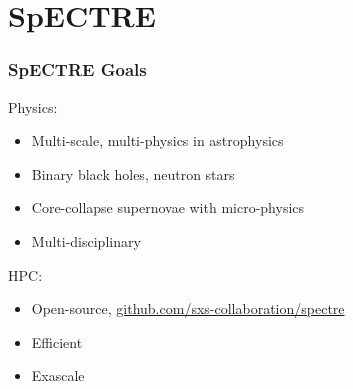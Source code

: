 \documentclass[svgnames,tikz,serif,ragged2e]{beamer}
\begin{document}
\makeatletter

\makeatother


\begin{frame}
  \titlepage{}
\end{frame}

\section{SpECTRE}


\begin{frame}
  \frametitle{SpECTRE Goals}
  Physics:
  \begin{itemize}
  \item Multi-scale, multi-physics in astrophysics
  \item Binary black holes, neutron stars
  \item Core-collapse supernovae with micro-physics
  \item Multi-disciplinary
  \end{itemize}
  HPC:\@
  \begin{itemize}
  \item Open-source, \href{https://github.com/sxs-collaboration/spectre}
    {github.com/sxs-collaboration/spectre}
  \item Efficient
  \item Exascale
  \end{itemize}
\end{frame}
\end{document}
